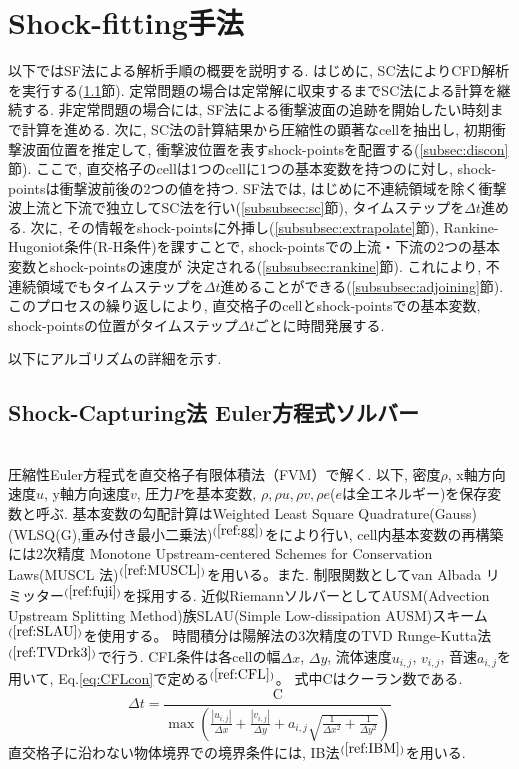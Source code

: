 \documentclass[a4j]{jarticle}
\begin{document}
\section{Shock-fitting手法} \label{sec:method}
以下ではSF法による解析手順の概要を説明する.
はじめに, SC法によりCFD解析を実行する(\ref{subsec:sc}節).
定常問題の場合は定常解に収束するまでSC法による計算を継続する.
非定常問題の場合には, SF法による衝撃波面の追跡を開始したい時刻まで計算を進める. 
次に, SC法の計算結果から圧縮性の顕著なcellを抽出し, 初期衝撃波面位置を推定して, 
衝撃波位置を表すshock-pointsを配置する(\ref{subsec:discon}節).
ここで, 直交格子のcellは1つのcellに1つの基本変数を持つのに対し, shock-pointsは衝撃波前後の2つの値を持つ.
SF法では, はじめに不連続領域を除く衝撃波上流と下流で独立してSC法を行い(\ref{subsubsec:sc}節), タイムステップを$\Delta t$進める.
次に, その情報をshock-pointsに外挿し(\ref{subsubsec:extrapolate}節), Rankine-Hugoniot条件(R-H条件)を課すことで, shock-pointsでの上流・下流の2つの基本変数とshock-pointsの速度が
決定される(\ref{subsubsec:rankine}節). これにより, 不連続領域でもタイムステップを$\Delta t$進めることができる(\ref{subsubsec:adjoining}節). 
このプロセスの繰り返しにより, 直交格子のcellとshock-pointsでの基本変数, shock-pointsの位置がタイムステップ$\Delta t$ごとに時間発展する. 

以下にアルゴリズムの詳細を示す.

\subsection{Shock-Capturing法 Euler方程式ソルバー} \label{subsec:sc}
\mbox{}\\[-3.0ex]

圧縮性Euler方程式を直交格子有限体積法（FVM）で解く.
以下, 密度$\rho$, x軸方向速度$u$, y軸方向速度$v$, 圧力$P$を基本変数,
$\rho, \rho u, \rho v, \rho e$($e$は全エネルギー)を保存変数と呼ぶ.
基本変数の勾配計算はWeighted Least Square Quadrature(Gauss)(WLSQ(G),重み付き最小二乗法)$^{(\ref{ref:gg})}$をにより行い, cell内基本変数の再構築には2次精度 Monotone Upstream-centered
Schemes for Conservation Laws(MUSCL 法)$^{(\ref{ref:MUSCL})}$を用いる。また. 制限関数としてvan Albada リミッター$^{(\ref{ref:fuji})}$を採用する.
近似RiemannソルバーとしてAUSM(Advection Upstream Splitting Method)族SLAU(Simple Low-dissipation AUSM)スキーム$^{(\ref{ref:SLAU})}$を使用する。
時間積分は陽解法の3次精度のTVD Runge-Kutta法$^{(\ref{ref:TVDrk3})}$で行う.
CFL条件は各cellの幅$\Delta x$, $\Delta y$, 流体速度$u_{i,j}$, $v_{i,j}$, 音速$a_{i, j}$を用いて, Eq.\ref{eq:CFLcon}で定める$^{(\ref{ref:CFL})}$。
式中$\mathrm{C}$はクーラン数である.
\begin{equation}
    \Delta t =
    \frac{\mathrm{C}}{
        \max\left(
            \frac{|u_{i,j}|}{\Delta x}
            + \frac{|v_{i,j}|}{\Delta y}
            + a_{i,j}
              \sqrt{
                \frac{1}{\Delta x^2}
                + \frac{1}{\Delta y^2}
              }
        \right)
    }
    \label{eq:CFLcon}
\end{equation}
直交格子に沿わない物体境界での境界条件には, IB法$^{(\ref{ref:IBM})}$を用いる.
\end{document}
